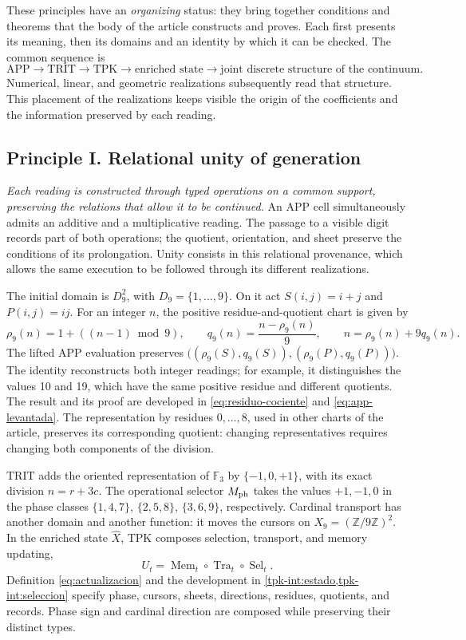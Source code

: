 These principles have an \emph{organizing} status: they bring together conditions and
theorems that the body of the article constructs and proves. Each first presents
its meaning, then its domains and an identity by which it can be checked.
The common sequence is
\[
 \mathrm{APP}\longrightarrow\mathrm{TRIT}\longrightarrow\mathrm{TPK}
 \longrightarrow\text{enriched state}
 \longrightarrow\text{joint discrete structure of the continuum}.
\]
Numerical, linear, and geometric realizations subsequently read that
structure. This placement of the realizations keeps visible the origin
of the coefficients and the information preserved by each reading.

\subsection*{Principle I. Relational unity of generation}
\hypertarget{prinh:unidad}{}

\emph{Each reading is constructed through typed operations on a
common support, preserving the relations that allow it to be continued.} An
APP cell simultaneously admits an additive and a multiplicative reading.
The passage to a visible digit records part of both operations; the
quotient, orientation, and sheet preserve the conditions of its
prolongation. Unity consists in this relational provenance, which allows
the same execution to be followed through its different realizations.

The initial domain is \(D_9^2\), with \(D_9=\{1,\ldots,9\}\). On it
act \(S(i,j)=i+j\) and \(P(i,j)=ij\). For an integer \(n\), the
positive residue-and-quotient chart is given by
\[
 \rho_9(n)=1+((n-1)\bmod9),\qquad
 q_9(n)=\frac{n-\rho_9(n)}9,\qquad
 n=\rho_9(n)+9q_9(n).
\]
The lifted APP evaluation preserves
\(\bigl((\rho_9(S),q_9(S)),(\rho_9(P),q_9(P))\bigr)\).
The identity reconstructs both integer readings; for example, it distinguishes
the values 10 and 19, which have the same positive residue and different
quotients. The result and its proof are developed in
\eqref{eq:residuo-cociente} and \eqref{eq:app-levantada}. The representation
by residues \(0,\ldots,8\), used in other charts of the article, preserves
its corresponding quotient: changing representatives requires changing both
components of the division.

TRIT adds the oriented representation of \(\mathbb F_3\) by
\(\{-1,0,+1\}\), with its exact division \(n=r+3c\). The operational selector
\(M_{\rm ph}\) takes the values \(+1,-1,0\) in the phase classes
\(\{1,4,7\}\), \(\{2,5,8\}\), \(\{3,6,9\}\), respectively.
Cardinal transport has another domain and another function: it moves the
cursors on \(X_9=(\mathbb Z/9\mathbb Z)^2\). In the enriched state
\(\widehat X\), TPK composes selection, transport, and memory
updating,
\[
 U_t=\operatorname{Mem}_t\circ\operatorname{Tra}_t
                    \circ\operatorname{Sel}_t.
\]
Definition \eqref{eq:actualizacion} and the development in
\cref{tpk-int:estado,tpk-int:seleccion} specify phase, cursors, sheets,
directions, residues, quotients, and records. Phase sign and cardinal
direction are composed while preserving their distinct types.

